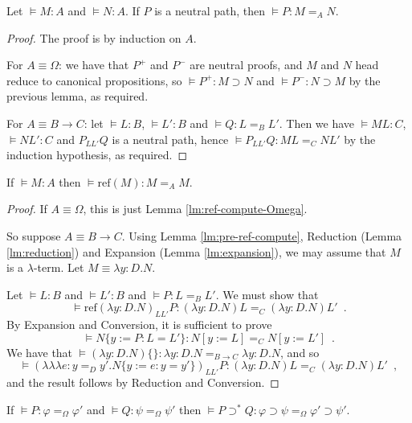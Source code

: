 \documentclass[a4paper,UKenglish]{lipics-v2016}
\newcommand*{\reff}[1]{\ensuremath{\mathrm{ref} \left( {#1} \right)}}
\newcommand*{\triplelambda}{\ensuremath{\lambda \!\! \lambda \!\! \lambda}}
\theoremstyle{plain}
\theoremstyle{definition}
\begin{document}
\begin{lemma}
\label{lm:neutral-path}
Let $\models M : A$ and $\models N : A$.  If $P$ is a neutral path, then $\models P : M =_A N$.
\end{lemma}

\begin{proof}
The proof is by induction on $A$.

For $A \equiv \Omega$: we have that $P^+$ and $P^-$ are neutral proofs, and $M$ and $N$ head reduce to canonical propositions, so $\models P^+ : M \supset N$ and
$\models P^- : N \supset M$ by the previous lemma, as required.

For $A \equiv B \rightarrow C$: let $\models L : B$, $\models L' : B$ and $\models Q : L =_B L'$.  Then we have $\models ML : C$, $\models NL' : C$ and
$P_{LL'} Q$ is a neutral path, hence $\models P_{L L'} Q : ML =_C NL'$ by the induction hypothesis, as required.
\end{proof}

\begin{lemma}
\label{lm:ref-compute}
If $\models M : A$ then $\models \reff{M} : M =_A M$.
\end{lemma}

\begin{proof}
If $A \equiv \Omega$, this is just Lemma \ref{lm:ref-compute-Omega}.

So suppose $A \equiv B \rightarrow C$.  Using Lemma \ref{lm:pre-ref-compute}, Reduction (Lemma \ref{lm:reduction}) and Expansion (Lemma \ref{lm:expansion}),
we may assume that $M$ is a $\lambda$-term.  Let $M \equiv \lambda y:D.N$.

Let $\models L : B$ and $\models L' : B$ and $\models P : L =_B L'$.  We must show that
\[ \models \reff{\lambda y:D.N}_{L L'} P : (\lambda y:D.N)L =_C (\lambda y:D.N)L' \enspace . \]
By Expansion and Conversion, it is sufficient to prove
\[ \models N \{ y := P : L = L' \} : N [ y:= L ] =_C N [y := L'] \enspace . \]
We have that $\models (\lambda y:D.N)\{\} : \lambda y:D.N =_{B \rightarrow C} \lambda y:D.N$, and so
\[ \models (\triplelambda e : y =_D y' . N \{ y := e : y = y' \})_{L L'} P : (\lambda y:D.N)L =_C (\lambda y:D.N)L' \enspace , \]
and the result follows by Reduction and Conversion.
\end{proof}

\begin{lemma}
\label{lm:compute-supset*}
If $\models P : \varphi =_\Omega \varphi'$ and $\models Q : \psi =_\Omega \psi'$ then $\models P \supset^* Q : \varphi \supset \psi =_\Omega \varphi' \supset \psi'$.
\end{lemma}
\end{document}

